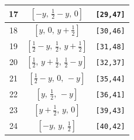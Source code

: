 \documentclass[fleqn,8pt]{jsarticle}
\begin{document}
\begin{longtable}{ccc}
17 & $\left[ - y,\, \frac{1}{2} - y,\, 0 \right]$ & {\tt [29,47]} \\ \hline
18 & $\left[ y,\, 0,\, y + \frac{1}{2} \right]$ & {\tt [30,46]} \\ \hline
19 & $\left[ \frac{1}{2} - y,\, \frac{1}{2},\, y + \frac{1}{2} \right]$ & {\tt [31,48]} \\ \hline
20 & $\left[ \frac{1}{2},\, y + \frac{1}{2},\, \frac{1}{2} - y \right]$ & {\tt [32,37]} \\ \hline
21 & $\left[ \frac{1}{2} - y,\, 0,\, - y \right]$ & {\tt [35,44]} \\ \hline
22 & $\left[ y,\, \frac{1}{2},\, - y \right]$ & {\tt [36,41]} \\ \hline
23 & $\left[ y + \frac{1}{2},\, y,\, 0 \right]$ & {\tt [39,43]} \\ \hline
24 & $\left[ - y,\, y,\, \frac{1}{2} \right]$ & {\tt [40,42]} \\
\end{longtable}
\renewcommand{\arraystretch}{1.2}
\end{document}
